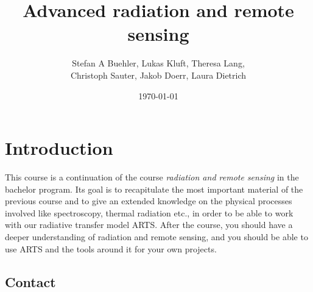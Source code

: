 
\usepackage{mathtools}
\usepackage{amssymb}  %
\renewcommand{\epsilon}{\varepsilon}  %

\usepackage{graphicx}  %
\usepackage{float}  %
\usepackage{floatflt}  %
\usepackage{subcaption}  %

\usepackage{enumerate}
\usepackage{textcomp}  %


\usepackage{chemfig}

%

\title{Advanced radiation and remote sensing}
\author{Stefan A Buehler, Lukas Kluft, Theresa Lang,\\ Christoph Sauter, Jakob Doerr, Laura Dietrich}
\date{\today}


\maketitle
\thispagestyle{empty}\pagestyle{empty}
\newpage
\tableofcontents
\newpage\pagestyle{fancy}



\section{Introduction}

This course is a continuation of the course \textit{radiation and
  remote sensing} in the bachelor program. Its goal is to
recapitulate the most important material of the previous course and to
give an extended knowledge on the physical processes involved like
spectroscopy, thermal radiation etc., in order to be able to work with
our radiative transfer model ARTS. After the course, you should have a
deeper understanding of radiation and remote sensing, and you should be
able to use ARTS and the tools around it for your own projects.

\subsection*{Contact}

